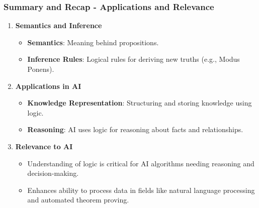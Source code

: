 \documentclass[aspectratio=169]{beamer}
\begin{document}
\begin{frame}[fragile]
    \frametitle{Summary and Recap - Applications and Relevance}
    \begin{enumerate}
        \item \textbf{Semantics and Inference}
        \begin{itemize}
            \item \textbf{Semantics}: Meaning behind propositions.
            \item \textbf{Inference Rules}: Logical rules for deriving new truths (e.g., Modus Ponens).
        \end{itemize}
        
        \item \textbf{Applications in AI}
        \begin{itemize}
            \item \textbf{Knowledge Representation}: Structuring and storing knowledge using logic.
            \item \textbf{Reasoning}: AI uses logic for reasoning about facts and relationships.
        \end{itemize}
        
        \item \textbf{Relevance to AI}
        \begin{itemize}
            \item Understanding of logic is critical for AI algorithms needing reasoning and decision-making.
            \item Enhances ability to process data in fields like natural language processing and automated theorem proving.
        \end{itemize}
    \end{enumerate}
\end{frame}
\end{document}

